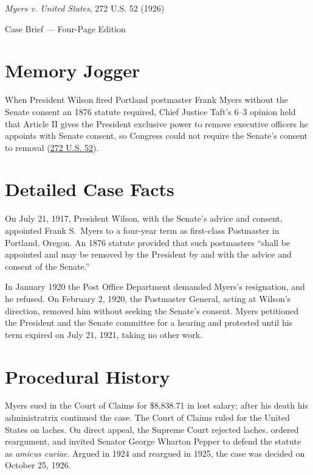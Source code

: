 \documentclass[12pt]{article}
\begin{document}
\begin{center}
{\LARGE \textit{Myers v. United States}, 272 U.S. 52 (1926)\par}
\vspace{0.8em}
{\large Case Brief --- Four-Page Edition\par}
\end{center}
\vspace{1em}

\section{Memory Jogger}

When President Wilson fired Portland postmaster Frank Myers without the Senate consent an 1876 statute required, Chief Justice Taft's 6--3 opinion held that Article II gives the President exclusive power to remove executive officers he appoints with Senate consent, so Congress could not require the Senate's consent to removal (\href{https://supreme.justia.com/cases/federal/us/272/52/}{272 U.S. 52}).

\section{Detailed Case Facts}

On July 21, 1917, President Wilson, with the Senate's advice and consent, appointed Frank S.\ Myers to a four-year term as first-class Postmaster in Portland, Oregon. An 1876 statute provided that such postmasters ``shall be appointed and may be removed by the President by and with the advice and consent of the Senate.''

In January 1920 the Post Office Department demanded Myers's resignation, and he refused. On February 2, 1920, the Postmaster General, acting at Wilson's direction, removed him without seeking the Senate's consent. Myers petitioned the President and the Senate committee for a hearing and protested until his term expired on July 21, 1921, taking no other work.

\section{Procedural History}

Myers sued in the Court of Claims for \$8,838.71 in lost salary; after his death his administratrix continued the case. The Court of Claims ruled for the United States on laches. On direct appeal, the Supreme Court rejected laches, ordered reargument, and invited Senator George Wharton Pepper to defend the statute as \textit{amicus curiae}. Argued in 1924 and reargued in 1925, the case was decided on October 25, 1926.
\end{document}
